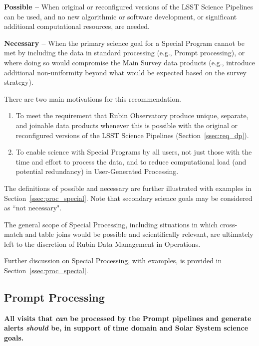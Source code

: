 \textbf{Possible -- } When original or reconfigured versions of the LSST
Science Pipelines can be used, and no new algorithmic or software development,
or significant additional computational resources, are needed.

\textbf{Necessary -- } When the primary science goal for a Special Program 
cannot be met by including the data in standard processing (e.g., Prompt processing),
or where doing so would compromise the Main Survey data products (e.g., introduce additional non-uniformity beyond what would be expected based on the survey strategy).

There are two main motivations for this recommendation.

\begin{enumerate}

\item To meet the requirement that Rubin Observatory produce
unique, separate, and joinable data products whenever this is possible 
with the original or reconfigured versions of the LSST Science Pipelines
(Section~\ref{ssec:req_dp}).

\item To enable science with Special Programs by all users, not just those
with the time and effort to process the data, and to reduce computational
load (and potential redundancy) in User-Generated Processing.

\end{enumerate}

The definitions of possible and necessary are further illustrated with examples in Section~\ref{ssec:proc_special}.
Note that secondary science goals may be considered as ``not necessary".

The general scope of Special Processing, including situations in which cross-match and table joins 
would be possible and scientifically relevant, 
are ultimately left to the discretion of Rubin Data Management in Operations.

Further discussion on Special Processing, with examples, is provided in Section~\ref{ssec:proc_special}.

\subsection{Prompt Processing}\label{ssec:sci_pproc}

\textbf{All visits that \emph{can} be processed by the Prompt pipelines and generate 
alerts \emph{should} be, in support of time domain and Solar System science goals.}


